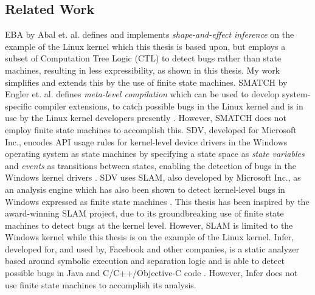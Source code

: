 \subsection{Related Work}
EBA by Abal et. al. defines and implements \textit{shape-and-effect inference} on the example of the Linux kernel \cite{Abal2017EffectiveBF} which this thesis is based upon, but employs a subset of Computation Tree Logic (CTL) to detect bugs rather than state machines, resulting in less expressibility, as shown in this thesis. My work simplifies and extends this by the use of finite state machines. SMATCH by Engler et. al. defines \textit{meta-level compilation} which can be used to develop system-specific compiler extensions, to catch possible bugs in the Linux kernel and is in use by the Linux kernel developers presently \cite{smatch}. However, SMATCH does not employ finite state machines to accomplish this. SDV, developed for Microsoft Inc., encodes API usage rules for kernel-level device drivers in the Windows operating system as state machines by specifying a state space as \textit{state variables} and \textit{events} as transitions between states, enabling the detection of bugs in the Windows kernel drivers \cite{SDV}. SDV uses SLAM, also developed by Microsoft Inc., as an analysis engine which has also been shown to detect kernel-level bugs in Windows expressed as finite state machines \cite{SLAM}. This thesis has been inspired by the award-winning SLAM project, due to its groundbreaking use of finite state machines to detect bugs at the kernel level. However, SLAM is limited to the Windows kernel while this thesis is on the example of the Linux kernel. Infer, developed for, and used by, Facebook and other companies, is a static analyzer based around symbolic execution and separation logic and is able to detect possible bugs in Java and C/C++/Objective-C code \cite{infer}. However, Infer does not use finite state machines to accomplish its analysis. 